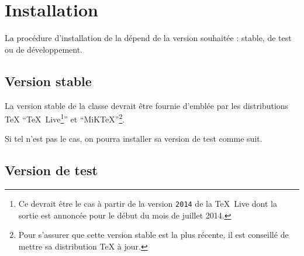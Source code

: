 \chapter{Installation}
\label{cha:installation}

\lstset{%
  basicstyle=\ttfamily\NoAutoSpacing,
  columns=flexible,
  frame=single
}

La procédure d'installation de la \yatcl{} dépend de la version souhaitée :
stable, de test ou de développement.

\section{Version stable}
\label{sec:version-stable}

La version stable de la classe devrait être fournie d'emblée par les
distributions \TeX{} \enquote{\TeX~Live\footnote{Ce devrait être le cas
    à partir de la version \texttt{2014} de la \TeX~Live dont la sortie est
    annoncée pour le début du mois de juillet 2014.}} et
\enquote{MiK\TeX{}}\footnote{Pour s'assurer que cette version stable est la
  plus récente, il est conseillé de mettre sa distribution \TeX{} à jour.}.

Si tel n'est pas le cas, on pourra installer sa version de test comme suit.

\section{Version de test}
\label{sec:version-de-test}

